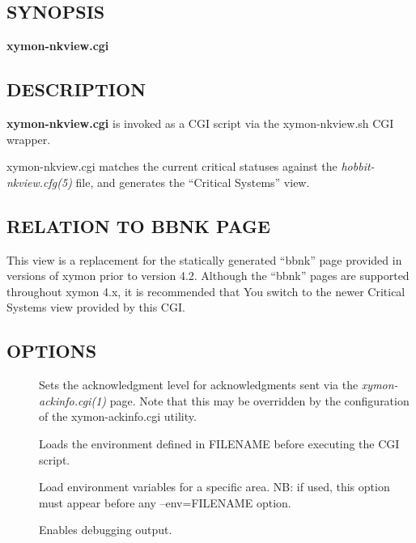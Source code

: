  \subsection{SYNOPSIS}
\textbf{xymon-nkview.cgi}


 
\subsection{DESCRIPTION}
\textbf{xymon-nkview.cgi}
 is invoked as a CGI script via the xymon-nkview.sh CGI wrapper. 

  xymon-nkview.cgi matches the current critical statuses against the \emph{hobbit-nkview.cfg(5)}
 file, and generates the ``Critical Systems'' view. 


 
\subsection{RELATION TO BBNK PAGE}
 This view is a replacement for the statically generated ``bbnk'' page
 provided in versions of xymon prior to version 4.2. Although the
 ``bbnk'' pages are supported throughout xymon 4.x, it is recommended
 that You switch to the newer Critical Systems view provided by this
 CGI. 


 
\subsection{OPTIONS}
\begin{description}
\item[] Sets the acknowledgment level for
  acknowledgments sent via the \emph{xymon-ackinfo.cgi(1)} page. Note
  that this may be overridden by the configuration of the
  xymon-ackinfo.cgi utility. 


 

\item[] Loads the environment defined in FILENAME before
  executing the CGI script. 


 

\item[] Load environment variables for a specific area. NB:
  if used, this option must appear before any --env=FILENAME option. 


 

\item[] Enables debugging output. 

 


\end{description}

